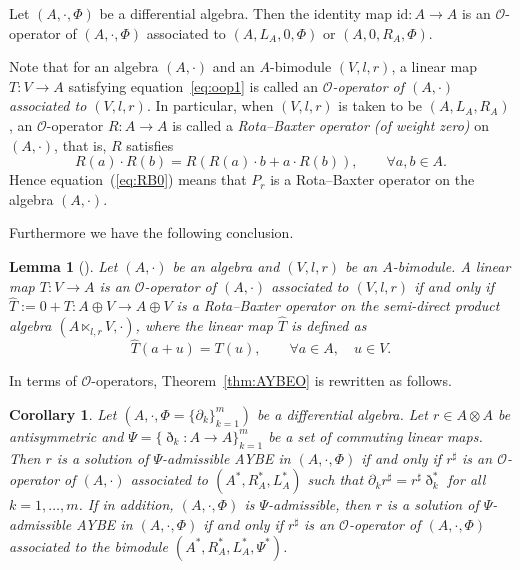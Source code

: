 \documentclass[pdftex]{sigma}
\numberwithin{equation}{section}
\newtheorem{Corollary}[Theorem]{Corollary}
\newtheorem{Lemma}[Theorem]{Lemma}
\newcommand{\id}{\mathrm{id}}
\begin{document}
\begin{Example}\label{example:o_operator}
 Let $(A, \cdot, \Phi)$ be a differential algebra.
 Then the identity map $\id\colon A \to A$ is an $\mathcal{O}$-operator of $(A, \cdot, \Phi)$ associated to $(A, L_A, 0, \Phi)$ or $(A, 0, R_A, \Phi)$.
\end{Example}

Note \cite{BaiDouble} that for an algebra $(A,\cdot)$ and an $A$-bimodule $(V, l, r)$, a linear map $T\colon V \to A$ satisfying equation~\eqref{eq:oop1} is called an \textit{$\mathcal{O}$-operator of $(A, \cdot)$ associated to $(V, l, r)$}.
In particular, when $(V,l,r)$ is taken to be $(A, L_A, R_A)$, an $\mathcal O$-operator $R\colon A \to A$ is called a \textit{Rota--Baxter operator (of weight zero)} on $(A, \cdot)$, that is, $R$ satisfies
\begin{equation*}
	R(a) \cdot R(b) = R(R(a) \cdot b + a \cdot R(b)), \qquad \forall a, b \in A.
\end{equation*}
Hence equation~(\ref{eq:RB0}) means that $P_r$ is a Rota--Baxter operator on the algebra $(A,\cdot)$.

Furthermore we have the following conclusion.
\begin{Lemma}[\cite{BGN0}]\label{lem:o2r}
	Let $(A, \cdot)$ be an algebra and $(V, l, r)$ be an $A$-bimodule.
	A linear map $T\colon V \to A$ is an $\mathcal{O}$-operator of $(A, \cdot)$ associated to $(V, l, r)$ if and only if $\hat T:=0 + T\colon A \oplus V \to A \oplus V$ is a Rota--Baxter operator on the semi-direct product algebra $(A \ltimes_{l, r} V, \cdot)$,
	where the linear map $\hat T$ is defined as
	\begin{equation}
		\hat T(a+u)=T(u),\qquad \forall a\in A,\quad u\in V. \label{eq:hatT}
	\end{equation}
\end{Lemma}

In terms of $\mathcal{O}$-operators, Theorem~\ref{thm:AYBEO} is rewritten as follows.
\begin{Corollary}\label{cor:aybe_o}
 Let $(A, \cdot, \Phi = \{\partial_k\}_{k=1}^m)$ be a differential algebra.
 Let $r \in A \otimes A$ be antisymmetric and
 $\Psi = \{\eth_k\colon A \to A\}_{k=1}^m$ be a set of commuting linear maps.
 Then $r$ is a solution of $\Psi$-admissible AYBE in $(A, \cdot, \Phi)$ if and only if
 $r^\sharp$ is an
	$\mathcal{O}$-operator of $(A, \cdot)$ associated to $(A^*, R_A^*, L_A^*)$ such that $\partial_k r^\sharp = r^\sharp \eth_k^*$ for all $k=1, \dots, m$.
 If in addition, $(A, \cdot, \Phi)$ is $\Psi$-admissible,
 then $r$ is a solution of $\Psi$-admissible AYBE in $(A, \cdot, \Phi)$ if and only if $r^\sharp$ is an $\mathcal{O}$-operator of $(A, \cdot, \Phi)$ associated to the bimodule $(A^*, R_A^*, L_A^*, \Psi^*)$.
\end{Corollary}
\end{document}
